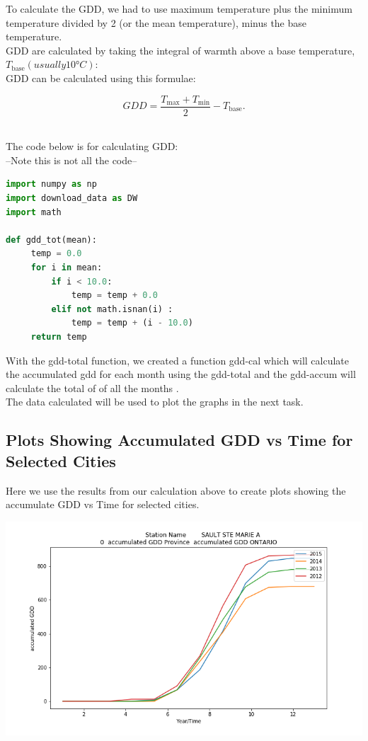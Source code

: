 To calculate the GDD, we had to use maximum temperature plus the minimum temperature divided by 2 (or the mean temperature), minus the base temperature.\\
GDD are calculated by taking the integral of warmth above a base temperature, $T_{{\mathrm  {base}}} (usually 10 °C):$\\
GDD can be calculated using this formulae:

$$GDD={\frac  {T_{{\mathrm  {max}}}+T_{{\mathrm  {min}}}}{2}}-T_{{\mathrm  {base}}}. $$\

The code below is for calculating GDD:\\
--Note this is not all the code--\\

\begin{lstlisting}[language=Python]
import numpy as np
import download_data as DW
import math

def gdd_tot(mean):
     temp = 0.0
     for i in mean:
         if i < 10.0:
             temp = temp + 0.0
         elif not math.isnan(i) :
             temp = temp + (i - 10.0)
     return temp

\end{lstlisting}

With the gdd-total function, we created a function gdd-cal which will calculate the accumulated gdd for each month using the gdd-total and the gdd-accum will calculate the total of of all the months  .\\
The data calculated will be used to plot the graphs in the next task.
  
\subsection{Plots Showing Accumulated GDD vs Time for\\ Selected Cities}

Here we use the results from our calculation above to create plots showing the accumulate GDD vs Time for selected cities. 

\includegraphics[scale=0.35]{Fig_GDD_50092.png}\\

